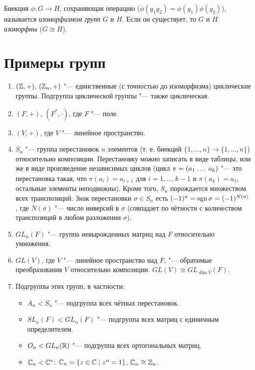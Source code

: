 \documentclass[main]{subfiles}
\begin{document}
\begin{definition}
  Биекция $\phi: G \to H$, сохраняющая операцию
  ($\phi(g_1 g_2) = \phi(g_1) \phi(g_2)$),
  называется \emph{изоморфизмом групп} \( G \) и \( H \).
  Если он существует, то $G$ и $H$ \emph{изоморфны}
  (\( G \cong H \)).
\end{definition}

\section{Примеры групп}
\begin{enumerate}
  \item $(\mathbb{Z}, +)$, $(\mathbb{Z}_n, +)$ "---
    единственные (с точностью до изоморфизма)
    циклические группы.
    Подгруппа циклической группы "--- также циклическая.
  \item $(F, +)$, $(F^*, \cdot)$, где $F$ "--- поле.
  \item $(V, +)$, где $V$ "--- линейное пространство.
  \item $S_n$ "--- группа перестановок $n$ элементов
    (т. е. биекций
    $\{ 1, \dots, n \} \to \{ 1, \dots, n \}$)
    относительно композиции.
    Перестановку можно записать в виде таблицы,
    или же в виде произведение
    независимых циклов
    (цикл $\pi = \Cycle{a_1 & \dots & a_k}$ "--- это перестановка такая,
    что $\pi(a_i) = a_{i + 1}$ для $i = 1, \dots, k - 1$
    и $\pi(a_k) = a_1$, остальные
    элементы неподвижны).
    Кроме того, $S_n$ порождается множеством всех транспозиций.
    Знак перестановки $\sigma \in S_n$ есть
    $(-1)^\sigma = \operatorname{sgn} \sigma = (-1)^{N(\sigma)}$,
    где $N(\sigma)$ "--- число инверсий в $\sigma$
    (совпадает по чётности
    с количеством транспозиций
    в любом разложении $\sigma$).
  \item $GL_n(F)$ "--- группа невырожденных матриц 
    над $F$ относительно умножения.
  \item $GL(V)$, где $V$ "--- линейное пространство над $F$,
    "--- обратимые преобразования
    $V$ относительно композиции.
    $GL(V) \cong GL_{\dim V}(F)$.
  \item Подгруппы этих групп, в частности:
    \begin{itemize}
      \item $A_n < S_n$ "--- подгруппа всех чётных перестановок.
      \item $SL_n(F) < GL_n(F)$ "--- подгруппа всех матриц с единичным определителем.
      \item $O_n < GL_n(\mathbb{R})$ "--- подгруппа всех ортогональных матриц.
      \item $\mathbb{C}_n < \mathbb{C}^*$:
	$\mathbb{C}_n = \{ z \in \mathbb{C} \mid z^n = 1 \}$,
	$\mathbb{C}_n \cong \mathbb{Z}_n$.
    \end{itemize}
\end{enumerate}
\end{document}
